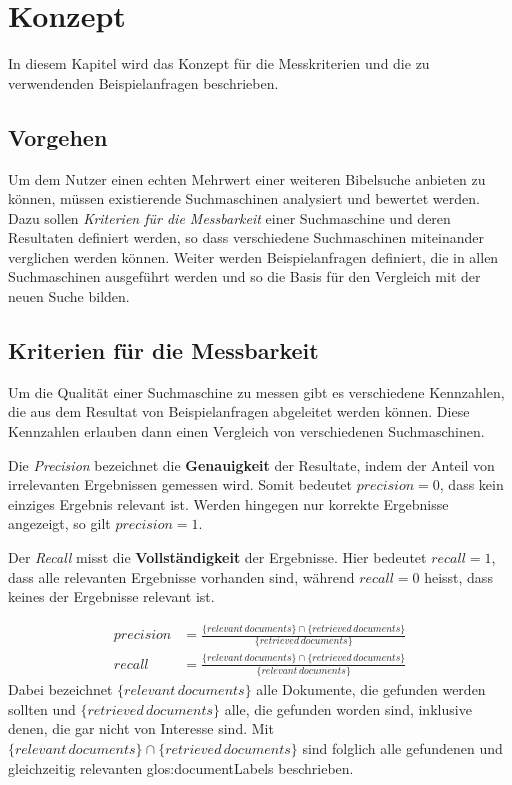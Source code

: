 \chapter{Konzept}
In diesem Kapitel wird das Konzept für die Messkriterien und die zu verwendenden Beispielanfragen beschrieben.

\section{Vorgehen}
Um dem Nutzer einen echten Mehrwert einer weiteren Bibelsuche anbieten zu können, müssen existierende Suchmaschinen analysiert und bewertet werden.
Dazu sollen \textit{Kriterien für die Messbarkeit} einer Suchmaschine und deren Resultaten definiert werden, so dass verschiedene Suchmaschinen miteinander verglichen werden können.
Weiter werden Beispielanfragen definiert, die in allen Suchmaschinen ausgeführt werden und so die Basis für den Vergleich mit der neuen Suche bilden.

\section{Kriterien für die Messbarkeit}
Um die Qualität einer Suchmaschine zu messen gibt es verschiedene Kennzahlen, die aus dem Resultat von Beispielanfragen abgeleitet werden können.
Diese Kennzahlen erlauben dann einen Vergleich von verschiedenen Suchmaschinen.

Die \textit{Precision} bezeichnet die \textbf{Genauigkeit} der Resultate, indem der Anteil von irrelevanten Ergebnissen gemessen wird.
Somit bedeutet $precision = 0$, dass kein einziges Ergebnis relevant ist.
Werden hingegen nur korrekte Ergebnisse angezeigt, so gilt $precision = 1$.

Der \textit{Recall} misst die \textbf{Vollständigkeit} der Ergebnisse. Hier bedeutet $recall = 1$, dass alle relevanten Ergebnisse vorhanden sind, während $recall = 0$ heisst, dass keines der Ergebnisse relevant ist.

\begin{align}
	precision & = \frac{\{relevant \, documents\} \cap \{retrieved \, documents\}}{\{retrieved \, documents\}} \\
	recall & = \frac{\{relevant \, documents\} \cap \{retrieved \, documents\}}{\{relevant \, documents\}}
\end{align}
Dabei bezeichnet $\{relevant \, documents\}$ alle Dokumente, die gefunden werden sollten und $\{retrieved \, documents\}$ alle, die gefunden worden sind, inklusive denen, die gar nicht von Interesse sind.
Mit $\{relevant \, documents\} \cap \{retrieved \, documents\}$ sind folglich alle gefundenen und gleichzeitig relevanten \glspl{glos:documentLabel} beschrieben.

